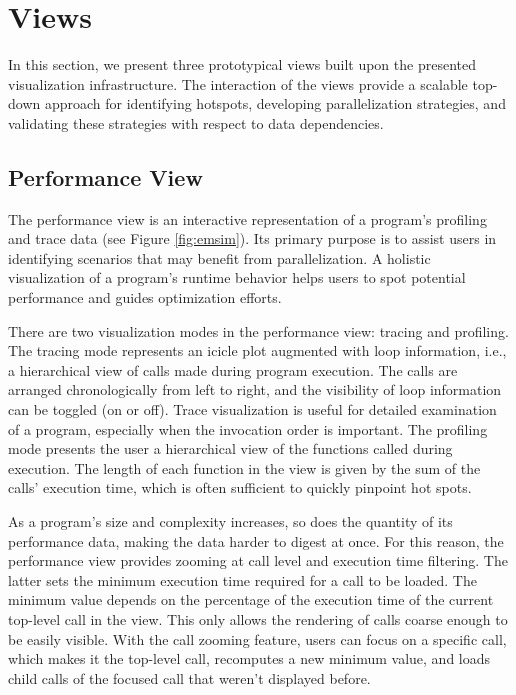 \section{Views}
In this section, we present three prototypical views built upon the
presented visualization infrastructure. The interaction of the views provide a
scalable top-down approach for identifying hotspots, developing parallelization
strategies, and validating these strategies with respect to data dependencies.

\subsection{Performance View}
\label{sec:performance_view}
The performance view is an interactive representation of a program's profiling
and trace data (see Figure \ref{fig:emsim}). Its primary purpose is to assist
users in identifying scenarios that may benefit from parallelization. A
holistic visualization of a program's runtime behavior helps users to spot
potential performance and guides optimization efforts.

There are two visualization modes in the performance view: tracing and
profiling. The tracing mode represents an icicle plot augmented with loop
information, i.e., a hierarchical view of calls made during program execution.
The calls are arranged chronologically from left to right, and the visibility
of loop information can be toggled (on or off). Trace visualization is useful
for detailed examination of a program, especially when the invocation order is
important. The profiling mode presents the user a hierarchical view of the
functions called during execution. The length of each function in the view is
given by the sum of the calls' execution time, which is often sufficient to
quickly pinpoint hot spots.

As a program's size and complexity increases, so does the quantity of its
performance data, making the data harder to digest at once. For this reason,
the performance view provides zooming at call level and execution time
filtering. The latter sets the minimum execution time required for a call to be
loaded. The minimum value depends on the percentage of the execution time of
the current top-level call in the view. This only allows the rendering of calls
coarse enough to be easily visible. With the call zooming feature, users can
focus on a specific call, which makes it the top-level call, recomputes a new
minimum value, and loads child calls of the focused call that weren't displayed
before.

